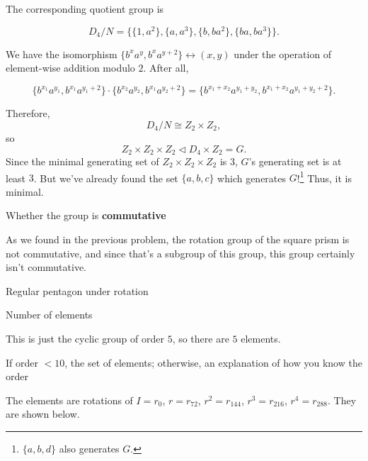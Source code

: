 \documentclass[../key.tex]{subfiles}
\begin{document}
\noindent The corresponding quotient group is

$$D_4/N = \{\{1,a^2\}, \{a,a^3\}, \{b,ba^2\}, \{ba, ba^3\}\}.$$

\noindent We have the isomorphism $\{b^xa^{y},b^xa^{y+2}\}\leftrightarrow (x,y)$ under the operation of element-wise addition modulo $2$. After all,

$$\{b^{x_1}a^{y_1},b^{x_1}a^{y_1+2}\}\cdot \{b^{x_2}a^{y_2},b^{x_1}a^{y_2+2}\} = \{b^{x_1+x_2}a^{y_1+y_2},b^{x_1+x_2}a^{y_1+y_2+2}\}.$$

\noindent Therefore, $$D_4/N \cong Z_2 \times Z_2,$$ so $$Z_2 \times Z_2 \times Z_2 \triangleleft D_4\times Z_2=G.$$ Since the minimal generating set of $Z_2\times Z_2\times Z_2$ is $3$, $G$'s generating set is at least $3$. But we've already found the set $\{a,b,c\}$ which generates $G$!\footnote{$\{a,b,d\}$ also generates $G$.} Thus, it is minimal.

\begin{inner_problem}
\item Whether the group is \textbf{commutative}
\end{inner_problem}

\noindent As we found in the previous problem, the rotation group of the square prism is not commutative, and since that's a subgroup of this group, this group certainly isn't commutative.

\begin{outer_problem}
\item Regular pentagon under rotation
\end{outer_problem}

\begin{inner_problem}[start=1]
\item Number of elements
\end{inner_problem}

\noindent This is just the cyclic group of order $5$, so there are $5$ elements.

\begin{inner_problem}
\item If order $< 10$, the set of elements; otherwise, an explanation of how you know the order
\end{inner_problem}

\noindent The elements are rotations of $I=r_0$, $r=r_{72}$, $r^2=r_{144}$, $r^3=r_{216}$, $r^4=r_{288}$. They are shown below.
\end{document}
